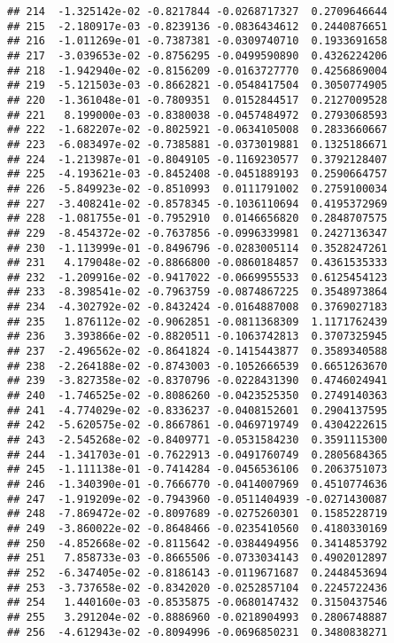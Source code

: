 \documentclass[
]{article}
\begin{document}
\begin{verbatim}
## 214  -1.325142e-02 -0.8217844 -0.0268717327  0.2709646644
## 215  -2.180917e-03 -0.8239136 -0.0836434612  0.2440876651
## 216  -1.011269e-01 -0.7387381 -0.0309740710  0.1933691658
## 217  -3.039653e-02 -0.8756295 -0.0499590890  0.4326224206
## 218  -1.942940e-02 -0.8156209 -0.0163727770  0.4256869004
## 219  -5.121503e-03 -0.8662821 -0.0548417504  0.3050774905
## 220  -1.361048e-01 -0.7809351  0.0152844517  0.2127009528
## 221   8.199000e-03 -0.8380038 -0.0457484972  0.2793068593
## 222  -1.682207e-02 -0.8025921 -0.0634105008  0.2833660667
## 223  -6.083497e-02 -0.7385881 -0.0373019881  0.1325186671
## 224  -1.213987e-01 -0.8049105 -0.1169230577  0.3792128407
## 225  -4.193621e-03 -0.8452408 -0.0451889193  0.2590664757
## 226  -5.849923e-02 -0.8510993  0.0111791002  0.2759100034
## 227  -3.408241e-02 -0.8578345 -0.1036110694  0.4195372969
## 228  -1.081755e-01 -0.7952910  0.0146656820  0.2848707575
## 229  -8.454372e-02 -0.7637856 -0.0996339981  0.2427136347
## 230  -1.113999e-01 -0.8496796 -0.0283005114  0.3528247261
## 231   4.179048e-02 -0.8866800 -0.0860184857  0.4361535333
## 232  -1.209916e-02 -0.9417022 -0.0669955533  0.6125454123
## 233  -8.398541e-02 -0.7963759 -0.0874867225  0.3548973864
## 234  -4.302792e-02 -0.8432424 -0.0164887008  0.3769027183
## 235   1.876112e-02 -0.9062851 -0.0811368309  1.1171762439
## 236   3.393866e-02 -0.8820511 -0.1063742813  0.3707325945
## 237  -2.496562e-02 -0.8641824 -0.1415443877  0.3589340588
## 238  -2.264188e-02 -0.8743003 -0.1052666539  0.6651263670
## 239  -3.827358e-02 -0.8370796 -0.0228431390  0.4746024941
## 240  -1.746525e-02 -0.8086260 -0.0423525350  0.2749140363
## 241  -4.774029e-02 -0.8336237 -0.0408152601  0.2904137595
## 242  -5.620575e-02 -0.8667861 -0.0469719749  0.4304222615
## 243  -2.545268e-02 -0.8409771 -0.0531584230  0.3591115300
## 244  -1.341703e-01 -0.7622913 -0.0491760749  0.2805684365
## 245  -1.111138e-01 -0.7414284 -0.0456536106  0.2063751073
## 246  -1.340390e-01 -0.7666770 -0.0414007969  0.4510774636
## 247  -1.919209e-02 -0.7943960 -0.0511404939 -0.0271430087
## 248  -7.869472e-02 -0.8097689 -0.0275260301  0.1585228719
## 249  -3.860022e-02 -0.8648466 -0.0235410560  0.4180330169
## 250  -4.852668e-02 -0.8115642 -0.0384494956  0.3414853792
## 251   7.858733e-03 -0.8665506 -0.0733034143  0.4902012897
## 252  -6.347405e-02 -0.8186143 -0.0119671687  0.2448453694
## 253  -3.737658e-02 -0.8342020 -0.0252857104  0.2245722436
## 254   1.440160e-03 -0.8535875 -0.0680147432  0.3150437546
## 255   3.291204e-02 -0.8886960 -0.0218904993  0.2806748887
## 256  -4.612943e-02 -0.8094996 -0.0696850231  0.3480838271

\end{verbatim}
\end{document}
